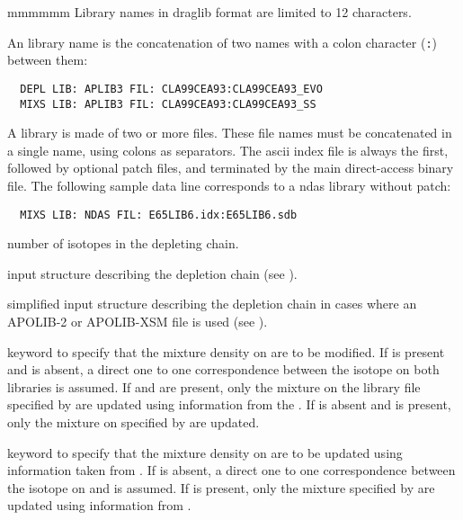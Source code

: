 \begin{ListeDeDescription}{mmmmmm}
Library names in {\sc draglib} format are limited to 12 characters.

An  library name is the concatenation of two names with a colon character ({\tt :}) between them:
\begin{verbatim}
  DEPL LIB: APLIB3 FIL: CLA99CEA93:CLA99CEA93_EVO
  MIXS LIB: APLIB3 FIL: CLA99CEA93:CLA99CEA93_SS
\end{verbatim}

A  library is made of two or more files. These file names must be concatenated in a single
 name, using colons as separators. The {\sc ascii} index file is always the first,
followed by optional patch files, and terminated by the main direct-access binary file. The
following sample data line corresponds to a {\sc ndas} library without patch:
\begin{verbatim}
  MIXS LIB: NDAS FIL: E65LIB6.idx:E65LIB6.sdb
\end{verbatim}

\item[\dusa{ndepl}] number of isotopes in the depleting chain.

\item[\dstr{descdepl}] input structure describing the
depletion chain (see ).

\item[\dstr{descdeplA2}] simplified input structure describing the
depletion chain in cases where an APOLIB-2 or APOLIB-XSM file is used (see ).

\item[\moc{MAXS}] keyword to specify that the mixture density on 
are to be modified. If  is present and  is absent, a
direct one to one correspondence between the isotope on both libraries is
assumed. If  and  are present, only the
mixture on the library file specified by  are updated using
information from the . If  is absent and
 is present, only the mixture on   specified by
 are updated.

\item[\moc{BURN}] keyword to specify that the mixture density on 
are to be updated using information taken from . If 
is absent, a direct one to one correspondence between the isotope on
 and   is assumed. If   is present, only
the mixture specified by  are updated using information from
.


\end{ListeDeDescription}
